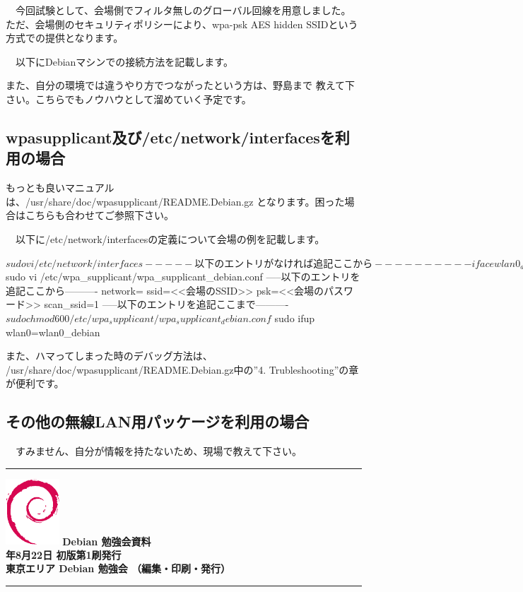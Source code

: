 \documentclass[mingoth,a4paper]{jsarticle}
\newcommand{\debmtgyear}{2015}
\newcommand{\debmtgmonth}{8}
\newcommand{\debmtgdate}{22}
\begin{document}
　今回試験として、会場側でフィルタ無しのグローバル回線を用意しました。
ただ、会場側のセキュリティポリシーにより、wpa-psk AES hidden SSIDという
方式での提供となります。

　以下にDebianマシンでの接続方法を記載します。

 また、自分の環境では違うやり方でつながったという方は、野島まで
教えて下さい。こちらでもノウハウとして溜めていく予定です。

 \subsection{wpasupplicant及び/etc/network/interfacesを利用の場合}

 もっとも良いマニュアルは、/usr/share/doc/wpasupplicant/README.Debian.gz
となります。困った場合はこちらも合わせてご参照下さい。

　以下に/etc/network/interfacesの定義について会場の例を記載します。

\begin{commandline}
$ sudo vi /etc/network/interfaces
-----以下のエントリがなければ追記ここから----------
iface wlan0_debian inet dhcp
     wpa-conf /etc/wpa_supplicant/wpa_supplicant_debian.conf
-----以下のエントリがなければ追記ここまで----------
$ sudo vi /etc/wpa_supplicant/wpa_supplicant_debian.conf
-----以下のエントリを追記ここから----------
network={
     ssid=<<会場のSSID>>
     psk=<<会場のパスワード>>
     scan_ssid=1
}
-----以下のエントリを追記ここまで----------
$ sudo chmod 600 /etc/wpa_supplicant/wpa_supplicant_debian.conf
$ sudo ifup wlan0=wlan0_debian
\end{commandline}

 また、ハマってしまった時のデバッグ方法は、
/usr/share/doc/wpasupplicant/README.Debian.gz中の''4. Trubleshooting''の章が便利です。

 \subsection{その他の無線LAN用パッケージを利用の場合}

　すみません、自分が情報を持たないため、現場で教えて下さい。

\cleartooddpage

\vspace*{15cm}
\hrule
\vspace{2mm}
\includegraphics[width=2cm]{image200502/openlogo-nd.eps}
\noindent \Large \bf Debian 勉強会資料\\
\noindent \normalfont \debmtgyear{}年\debmtgmonth{}月\debmtgdate{}日 \hspace{5mm}  初版第1刷発行\\
\noindent \normalfont 東京エリア Debian 勉強会 （編集・印刷・発行）\\
\hrule
\end{document}
